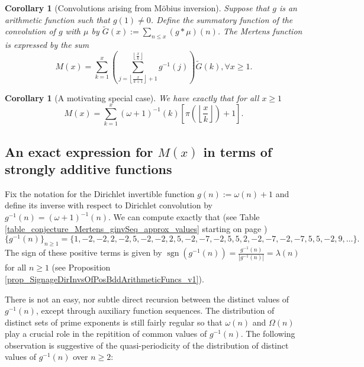 \documentclass[11pt,reqno,a4letter]{article}
\numberwithin{figure}{section}
\numberwithin{table}{section}
\newcommand{\floor}[1]{\left\lfloor #1 \right\rfloor}
\newcommand{\Floor}[2]{\ensuremath{\left\lfloor \frac{#1}{#2} \right\rfloor}}
\theoremstyle{plain}
\newtheorem{cor}[theorem]{Corollary}
\numberwithin{theorem}{section}
\theoremstyle{definition}
\begin{document}
\begin{cor}[Convolutions arising from M\"obius inversion] 
\label{cor_CvlGAstMu} 
Suppose that $g$ is an arithmetic function such that 
$g(1) \neq 0$. Define the summatory function of 
the convolution of $g$ with $\mu$ by $\widetilde{G}(x) := \sum_{n \leq x} (g \ast \mu)(n)$. 
The Mertens function is expressed by the sum 
\[
M(x) = \sum_{k=1}^{x} \left(\sum_{j=\floor{\frac{x}{k+1}}+1}^{\floor{\frac{x}{k}}} g^{-1}(j)\right) 
     \widetilde{G}(k), \forall x \geq 1. 
\]
\end{cor} 

\begin{cor}[A motivating special case] 
\label{cor_Mx_gInvnPixk_formula} 
We have exactly that for all $x \geq 1$ 
\begin{equation} 
\label{eqn_Mx_gInvnPixk_formula} 
M(x) = \sum_{k=1}^{x} (\omega+1)^{-1}(k) \left[\pi\left(\Floor{x}{k}\right) + 1\right]. 
\end{equation} 
\end{cor} 

\subsection{An exact expression for $M(x)$ in terms of strongly additive functions} 
\label{example_InvertingARecRelForMx_Intro}

Fix the notation for the Dirichlet invertible function $g(n) := \omega(n) + 1$ and define its 
inverse with respect to Dirichlet convolution by $g^{-1}(n) = (\omega+1)^{-1}(n)$. 
We can compute exactly that 
(see Table \ref{table_conjecture_Mertens_ginvSeq_approx_values} starting on page 
\pageref{table_conjecture_Mertens_ginvSeq_approx_values}) 
\[
\{g^{-1}(n)\}_{n \geq 1} = \{1, -2, -2, 2, -2, 5, -2, -2, 2, 5, -2, -7, -2, 5, 5, 2, -2, -7, -2, 
     -7, 5, 5, -2, 9, \ldots \}. 
\] 
The sign of these positive terms is given by 
$\operatorname{sgn}(g^{-1}(n)) = \frac{g^{-1}(n)}{|g^{-1}(n)|} = \lambda(n)$ for all $n \geq 1$ 
(see Proposition \ref{prop_SignageDirInvsOfPosBddArithmeticFuncs_v1}). 

There is not an easy, nor subtle 
direct recursion between the distinct values of $g^{-1}(n)$, except through auxiliary function sequences. 
The distribution of distinct sets of prime exponents is still fairly regular so that 
$\omega(n)$ and $\Omega(n)$ play a crucial role in the repitition of common values of 
$g^{-1}(n)$. 
The following observation is suggestive of the quasi-periodicity of the distribution of 
distinct values of $g^{-1}(n)$ over $n \geq 2$: 
\end{document}
